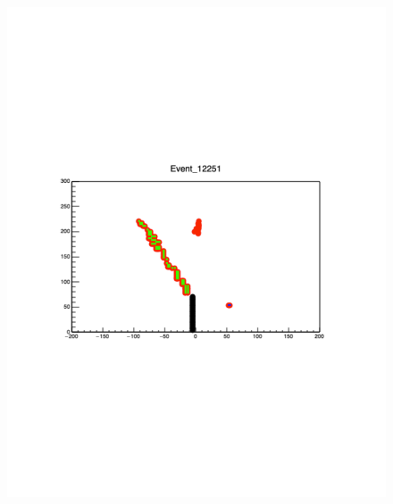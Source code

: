 \documentclass[final,number,sort&compress,5p,times,twocolumn]{elsarticle}
\begin{document}
\begin{figure}[hbt!]
	
  		\includegraphics[width=1.0\linewidth]{figures/9C_Inelastic_Central_1}


\end{figure}
\end{document}
